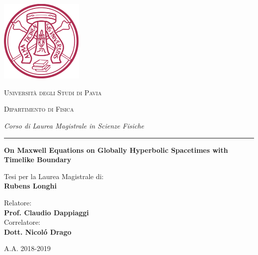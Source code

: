 \documentclass[
11pt,,a4paper %
]{book} %
\theoremstyle{TheoremStyle}
\theoremstyle{ExampleAndRemarkStyle}
\theoremstyle{ProofStyle}
\begin{document}
\frontmatter %

\pagestyle{plain} %


\begin{titlepage}
	\centering
	\includegraphics[width=0.3\textwidth]{unipv}\par\vspace{0.5cm}
	{\scshape\huge Universit\`a degli Studi di Pavia\par}
	\vspace{0.5cm}
	{\scshape\LARGE Dipartimento di Fisica\par
		\vspace{0.2cm}
		\Large\textit{Corso di Laurea Magistrale in Scienze Fisiche}\par}
	\vspace{0.5cm}
	\rule{14cm}{0.1pt}
	
	\vspace{1.5cm}
	{\huge\bfseries On Maxwell Equations on Globally Hyperbolic Spacetimes with Timelike Boundary \par}
	\vspace{1.5cm}
	\vfill\large\begin{flushright} Tesi per la Laurea Magistrale di:\\ \textbf{Rubens Longhi} %
	\end{flushright}
	\vspace{.5cm}
	\begin{flushleft}
		Relatore:\\
		\textbf{Prof. Claudio Dappiaggi}\\[.3cm] %
		Correlatore:\\
		\textbf{Dott. Nicol\'o Drago}\\[.3cm] %
	\end{flushleft}
	
	
	
	\vfill
	
	{\large A.A. 2018-2019\par}
\end{titlepage}
\end{document}
